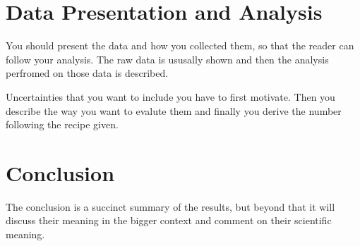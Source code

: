 \documentclass[12pt]{article}
\begin{document}
\section{Data Presentation and Analysis}

You should present the data and how you collected them, so that the reader can
follow your analysis. The raw data is ususally shown and then the analysis
perfromed on those data is described.

Uncertainties that you want to include you have to first motivate. Then you
describe the way you want to evalute them and finally you derive the number
following the recipe given.

\section{Conclusion}

The conclusion is a succinct summary of the results, but beyond that it will
discuss their meaning in the bigger context and comment on their scientific
meaning.
\end{document}
